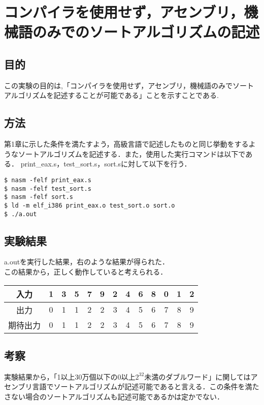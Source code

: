 \chapter{コンパイラを使用せず，アセンブリ，機械語のみでのソートアルゴリズムの記述}
\vspace{-1cm}
\section{目的}
この実験の目的は,「コンパイラを使用せず，アセンブリ，機械語のみでソートアルゴリズムを記述することが可能である」ことを示すことである.

\section{方法}
第1章に示した条件を満たすよう，高級言語で記述したものと同じ挙動をするようなソートアルゴリズムを記述する．また，使用した実行コマンドは以下である．
print\_eax.s，test\_sort.s，sort.sに対して以下を行う．
\begin{lstlisting}[numbers={none}, caption={実行コマンド}, label={fig:実行コマンド}]
$ nasm -felf print_eax.s
$ nasm -felf test_sort.s
$ nasm -felf sort.s
$ ld -m elf_i386 print_eax.o test_sort.o sort.o
$ ./a.out
\end{lstlisting}

\section{実験結果}
\begin{table}[h]
  \centering
   \begin{minipage}{0.45\textwidth}
     a.outを実行した結果，右のような結果が得られた．\\
     この結果から，正しく動作していると考えられる．
   \end{minipage}
   \hfill
   \begin{minipage}{0.45\textwidth}
     \centering
     \begin{tabular}{c|cccccccccccc}
       入力 & 1 & 3 & 5 & 7 & 9 & 2 & 4 & 6 & 8 & 0 & 1 & 2\\\hline
       出力 & 0 & 1 & 1 & 2 & 2 & 3 & 4 & 5 & 6 & 7 & 8 & 9\\
       期待出力 & 0 & 1 & 1 & 2 & 2 & 3 & 4 & 5 & 6 & 7 & 8 & 9\\
     \end{tabular}
   \end{minipage}
\end{table}

\section{考察}
実験結果から，「1以上30万個以下の0以上$2^{32}$未満のダブルワード」に関してはアセンブリ言語でソートアルゴリズムが記述可能であると言える．この条件を満たさない場合のソートアルゴリズムも記述可能であるかは定かでない．
